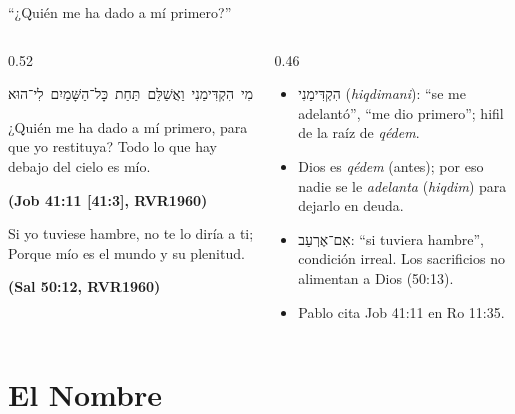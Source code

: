 \documentclass[hyperref={bookmarks=false},aspectratio=169]{beamer}
\newcommand{\heb}[1]{\mbox{\foreignlanguage{hebrew}{#1}}}
\newcommand{\fuente}[1]{\par\hfill{\upshape\bfseries\footnotesize\textcolor{azul}{#1}}}
\begin{document}
\begin{frame}{``¿Quién me ha dado a mí primero?''}
\begin{columns}[t,onlytextwidth]
\begin{column}{0.52\textwidth}
\begin{center}\heb{מִי הִקְדִּימַנִי וַאֲשַׁלֵּם תַּחַת כָּל־הַשָּׁמַיִם לִי־הוּא}\end{center}
\begin{cita}¿Quién me ha dado a mí primero, para que yo restituya? Todo lo que hay debajo del cielo es mío.\fuente{(Job 41:11 [41:3], RVR1960)}\end{cita}
\begin{cita}Si yo tuviese hambre, no te lo diría a ti; Porque mío es el mundo y su plenitud.\fuente{(Sal 50:12, RVR1960)}\end{cita}
\end{column}
\begin{column}{0.46\textwidth}\scriptsize
\begin{itemize}
\item \heb{הִקְדִּימַנִי} (\emph{hiqdimani}): ``se me adelantó'', ``me dio primero''; hifil de la raíz de \emph{qédem}.
\item Dios es \emph{qédem} (antes); por eso nadie se le \emph{adelanta} (\emph{hiqdim}) para dejarlo en deuda.
\item \heb{אִם־אֶרְעַב}: ``si tuviera hambre'', condición irreal. Los sacrificios no alimentan a Dios (50:13).
\item Pablo cita Job 41:11 en Ro 11:35.
\end{itemize}
\end{column}
\end{columns}
\end{frame}

\section{El Nombre}
\end{document}
